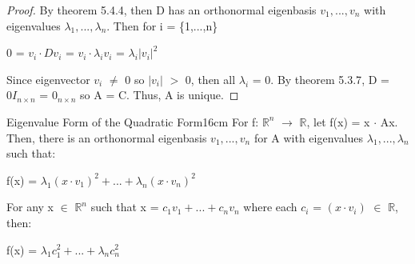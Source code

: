\begin{proof}
        By {\color{red} theorem 5.4.4}, then D has an orthonormal eigenbasis
        $v_1,...,v_n$ with eigenvalues $\lambda_1,...,\lambda_n$.
        Then for i = \{1,...,n\}

        \hspace{0.5cm}
        0 = $v_i \cdot Dv_i$
        = $v_i \cdot \lambda_i v_i$
        = $\lambda_i |v_i|^2$

        Since eigenvector $v_i$ $\not =$ 0 so $|v_i|$ $>$ 0, then
        all $\lambda_i$ = 0. By {\color{red} theorem 5.3.7},
        D = $0 I_{n \times n}$ = $0_{n \times n}$ so A = C.
        Thus, A is unique.
    \end{proof}

    \vspace{0.5cm}



    \begin{wtheorem}{Eigenvalue Form of the Quadratic Form}{16cm}
        For f: $\mathbb{R}^n$ $\rightarrow$ $\mathbb{R}$,
        let f(x) = x $\cdot$ Ax. Then, there is an orthonormal eigenbasis
        $v_1,...,v_n$ for A with eigenvalues $\lambda_1,...,\lambda_n$ such that:

        \hspace{0.5cm}
        f(x) = $\lambda_1(x \cdot v_1)^2 + ... + \lambda_n(x \cdot v_n)^2$

        For any x $\in$ $\mathbb{R}^n$
        such that x = $c_1v_1 + ... + c_nv_n$ where each
        $c_i$ = $(x \cdot v_i)$ $\in$ $\mathbb{R}$, then:

        \hspace{0.5cm}
        f(x) = $\lambda_1c_1^2 + ... + \lambda_nc_n^2$
    \end{wtheorem}

